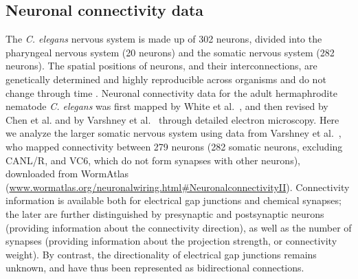 \documentclass[10pt,letterpaper]{article}
\begin{document}


\subsection*{Neuronal connectivity data}
The \emph{C. elegans} nervous system is made up of 302 neurons, divided into the pharyngeal nervous system (20 neurons) and the somatic nervous system (282 neurons).
The spatial positions of neurons, and their interconnections, are genetically determined and highly reproducible across organisms \cite{Riddle1997} and do not change through time \cite{Schnabel1997}.
Neuronal connectivity data for the adult hermaphrodite nematode \emph{C. elegans} was first mapped by White et al.~\cite{White:1986tx}, and then revised by Chen et al. \cite{Chen:2006ie} and by Varshney et al.~\cite{Varshney2011} through detailed electron microscopy.
Here we analyze the larger somatic nervous system using data from Varshney et al.~\cite{Varshney2011}, who mapped connectivity between 279 neurons (282 somatic neurons, excluding CANL/R, and VC6, which do not form synapses with other neurons), downloaded from WormAtlas (\url{www.wormatlas.org/neuronalwiring.html#NeuronalconnectivityII}).
Connectivity information is available both for electrical gap junctions and chemical synapses; the later are further distinguished by presynaptic and postsynaptic neurons (providing information about the connectivity direction), as well as the number of synapses (providing information about the projection strength, or connectivity weight).
By contrast, the directionality of electrical gap junctions remains unknown, and have thus been represented as bidirectional connections.
\end{document}
